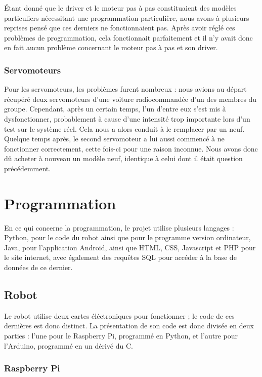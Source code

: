 \documentclass[12pt,a4paper]{article}
\begin{document}
	Étant donné que le driver et le moteur pas à pas constituaient des modèles particuliers nécessitant une programmation particulière, nous avons à plusieurs reprises pensé que ces derniers ne fonctionnaient pas. Après avoir réglé ces problèmes de programmation, cela fonctionnait parfaitement et il n’y avait donc en fait aucun problème concernant le moteur pas à pas et son driver.
	
	\subsubsection{Servomoteurs}
	
	Pour les servomoteurs, les problèmes furent nombreux : nous avions au départ récupéré deux servomoteurs d’une voiture radiocommandée d’un des membres du groupe. Cependant, après un certain temps, l’un d’entre eux s’est mis à dysfonctionner, probablement à cause d’une intensité trop importante lors d’un test sur le système réel. Cela nous a alors conduit à le remplacer par un neuf. Quelque temps après, le second servomoteur a lui aussi commencé à ne fonctionner correctement, cette fois-ci pour une raison inconnue. Nous avons donc dû acheter à nouveau un modèle neuf, identique à celui dont il était question précédemment.
	\newpage
	\section{Programmation}
	
	\indent\indent En ce qui concerne la programmation, le projet utilise plusieurs langages \nolinebreak: Python, pour le code du robot ainsi que pour le programme version ordinateur, Java, pour l'application Android, ainsi que HTML, CSS, Javascript et PHP pour le site internet, avec également des requêtes SQL pour accéder à la base de données de ce dernier.
	
	\subsection{Robot}
	
	\indent\indent Le robot utilise deux cartes éléctroniques pour fonctionner ; le code de ces dernières est donc distinct. La présentation de son code est donc divisée en deux parties : l'une pour le Raspberry Pi, programmé en Python, et l'autre pour l'Arduino, programmé en un dérivé du C. 
	
	\subsubsection{Raspberry Pi}
	
\end{document}

